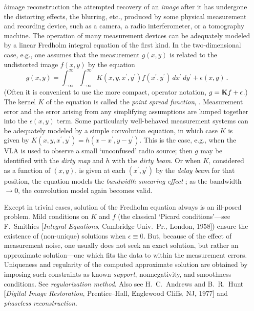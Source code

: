\aa{image reconstruction}
the attempted recovery of an {\it image} after it has undergone
the distorting effects, the blurring, etc., produced by some
physical measurement and recording device, such as a camera,
a radio interferometer, or a tomography machine.
The operation of many measurement devices can be adequately modeled by
a linear Fredholm integral equation of the first kind.
In the two-dimensional case, e.g., one assumes
that the measurement $g(x,y)$ is related to the undistorted image $f(x,y)$
by the equation
$$g(x,y)=\int_{-\infty}^\infty\int_{-\infty}^{\infty}
          K(x,y,x^\prime,y^\prime)f(x^\prime,y^\prime)\,
          dx^\prime\,dy^\prime+\epsilon(x,y)\,.$$
(Often it is convenient to use the more compact, operator notation,
$g=\bold Kf+\epsilon$.)
The kernel $K$ of the equation is called the {\it point spread function}, \qv.
Measurement error and the error arising from any simplifying
assumptions are lumped together into the $\epsilon(x,y)$ term.
Some particularly well-behaved measurement systems can be adequately modeled
by a simple convolution equation, in which case $K$ is given by
$K(x,y,x^\prime,y^\prime)=h(x-x^\prime,y-y^\prime)$.
This is the case, e.g., when the VLA is used to observe
a small `unconfused' radio source; then $g$ may be identified with
the {\it dirty map} and $h$ with the {\it dirty beam}.
Or when $K$, considered as a function of $(x,y)$,
is given at each $(x^\prime,y^\prime)$ by the {\it delay beam}
for that position, the equation models the {\it bandwidth smearing
effect} \qv; as the bandwidth $\to0$, the convolution model
again becomes valid.
\par
Except in trivial cases, solution of the Fredholm equation always
is an ill-posed problem.
Mild conditions on $K$ and $f$
(the classical `Picard conditions'---see F.~Smithies
[{\it Integral Equations}, Cambridge Univ.\ Pr., London, 1958])
ensure the existence of (non-unique) solutions when $\epsilon\equiv0$.
But, because of the effect of measurement noise,
one usually does not seek an exact solution,
but rather an approximate solution---one which fits the data
to within the measurement errors.
Uniqueness and regularity of the computed approximate solution are obtained
by imposing such constraints as known {\it support}\/,
nonnegativity, and smoothness conditions.
See {\it regularization method}.
Also see H.~C.~Andrews and B.~R.~Hunt [{\it Digital Image
Restoration}, Prentice--Hall, Englewood Cliffs, NJ, 1977]
and {\it phaseless reconstruction}.


